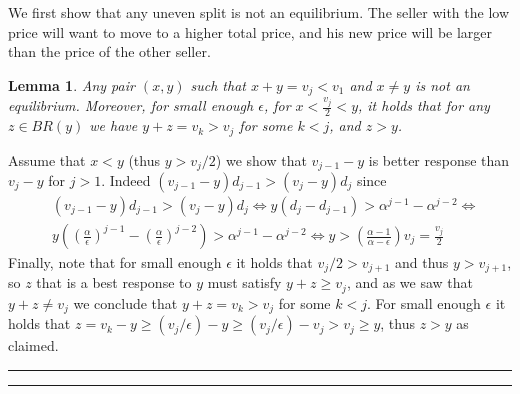 \documentclass[11pt,a4paper]{article}
\newcommand{\qed}{\rule{1.5mm}{2mm}\vspace{0.1in}}
\newenvironment{proof}{\par\noindent{\bf Proof:}}{\qed}
\newtheorem{lemma}[theorem]{Lemma}
\begin{document}
\begin{proof}
	
	We first show that any uneven split is not an equilibrium. The seller with the low price will want to move to a higher total price, and his new price will be larger than the price of the other seller.
	\begin{lemma}
		\label{lem:non-equal-not-ne}
		Any pair $(x,y)$ such that $x+y=v_j<v_1$ and $x\neq y$ is not an equilibrium.
		Moreover, for small enough $\epsilon$, for $x<\frac{v_j}{2}<y$, it holds that for any $z\in BR(y)$
		we have
		$y+z=v_k>v_j$ for some $k<j$, and $z>y$.
	\end{lemma}
	\begin{proof}
		Assume that $x<y$ (thus $y>v_j/2$) we show that $v_{j-1}-y$ is better response than $v_j-y$ for $j>1$.
		Indeed $(v_{j-1}-y)d_{j-1}> (v_{j}-y)d_{j}$ since
		\begin{align*}	
		& (v_{j-1}-y)d_{j-1}> (v_{j}-y)d_{j} \Leftrightarrow  y(d_j-d_{j-1})> \alpha^{j-1} - \alpha^{j-2} \Leftrightarrow\\
		& y\left( \left(\frac{\alpha}{\epsilon}\right)^{j-1} - \left(\frac{\alpha}{\epsilon}\right)^{j-2}  \right) > \alpha^{j-1} - \alpha^{j-2} \Leftrightarrow  y>\left(\frac{\alpha-1}{\alpha-\epsilon}\right) v_j = \frac{v_j}{2}
		\end{align*}
		Finally, note that for small enough $\epsilon$ it holds that $v_j/2>v_{j+1}$ and thus $y>v_{j+1}$, so
		$z$ that is a best response to $y$ must
		satisfy $y+z\geq v_j$, and as we saw that $y+z\neq v_j$ we conclude that $y+z=v_k>v_j$ for some $k<j$.
		For small enough $\epsilon$ it holds that $z = v_k-y\geq (v_j/\epsilon)- y \geq (v_j/\epsilon) - v_j > v_j \geq  y$,
		thus $z>y$ as claimed.
	\end{proof}
	

\end{proof}
\end{document}
